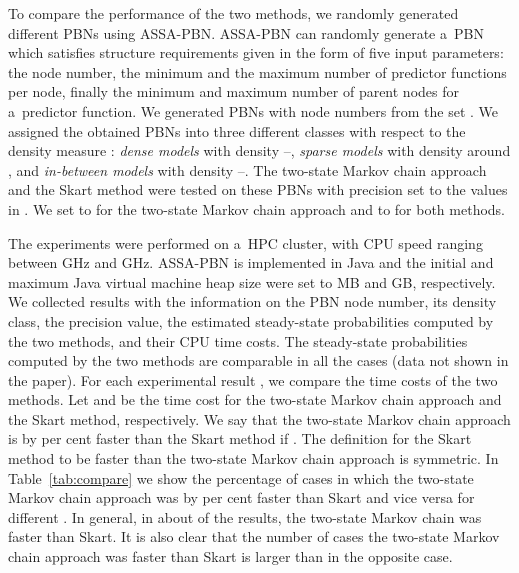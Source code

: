 \documentclass[runningheads,a4paper]{llncs}
\begin{document}
To compare the performance of the two methods, we randomly generated  different PBNs
using {\sf ASSA-PBN}. {\sf ASSA-PBN} can randomly generate a~PBN which satisfies structure
requirements given in the form of five input parameters: the node number, the minimum and the
maximum number of predictor functions per node, finally the minimum and maximum number of
parent nodes for a~predictor function. We generated PBNs with node numbers from the set
. We assigned the
obtained PBNs into three different classes with respect to the density measure :
\emph{dense models} with density --, \emph{sparse models} with density around , and
\emph{in-between models} with density --. The two-state Markov chain approach and the
Skart method were tested on these PBNs with precision  set to the values in
. We set
 to  for the two-state Markov chain approach and  to  for both
methods.

The experiments were performed on a~HPC cluster, with CPU speed ranging between GHz and
GHz. {\sf ASSA-PBN} is implemented in Java and the initial and maximum Java virtual machine
heap size were set to MB and GB, respectively. We collected  results with
the information on the PBN node number, its density class, the precision value, the estimated
steady-state probabilities computed by the two methods, and their CPU time costs. The steady-state
probabilities computed by the two methods are comparable in all the cases (data not shown in the
paper). For each experimental result , we compare the time costs of the two methods. Let
 and  be the time cost for the two-state Markov chain approach
and the Skart method, respectively. We say that the two-state Markov chain approach is by  per
cent faster than the Skart method if . The definition for the Skart method to be faster than the
two-state Markov chain approach is symmetric. In Table~\ref{tab:compare} we show the percentage of
cases in which the two-state Markov chain approach was by  per cent faster than Skart and vice
versa for different . In general, in about  of the results, the two-state Markov chain
was faster than Skart. It is also clear that the number of cases the two-state Markov chain
approach was faster than Skart is larger than in the opposite case.
\end{document}
